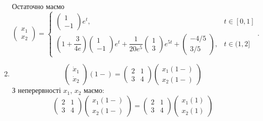 \begin{solution}
\begin{enumerate}
		Остаточно маємо 
		\[
			\begin{pmatrix}
			x_1 \\
			x_2
			\end{pmatrix}
			=
			\begin{cases}
				\begin{pmatrix}
					1 \\
					-1
				\end{pmatrix} 
				e^t, & t \in [0, 1] \\
				\left(1 + \dfrac{3}{4e}\right) 
				\begin{pmatrix}
				1 \\
				-1
				\end{pmatrix} 
				e^t 
				+ 
				\dfrac{1}{20e^5} 
				\begin{pmatrix}
				1 \\
				3
				\end{pmatrix} 
				e^{5t} 
				+ 
				\begin{pmatrix} 
					-4/5 \\
					3/5
				\end{pmatrix}			
				, & t \in (1, 2]
			\end{cases}.
		\]
		\item 
		\[
			\begin{pmatrix}
				\dot x_1 \\
				\dot x_2
			\end{pmatrix}
			(1-) 
			= 
			\begin{pmatrix}
				2 & 1 \\
				3 & 4
			\end{pmatrix}
			\begin{pmatrix}
				x_1(1-) \\
				x_2(1-)
			\end{pmatrix}
		\]
		З неперервності $x_1$, $x_2$ маємо:
		\[
			\begin{pmatrix}
				2 & 1 \\
				3 & 4
			\end{pmatrix}
			\begin{pmatrix}
				x_1(1-) \\
				x_2(1-)
			\end{pmatrix}
			=
			\begin{pmatrix}
			2 & 1 \\
			3 & 4
			\end{pmatrix}
			\begin{pmatrix}
			x_1(1) \\
			x_2(1)
			\end{pmatrix}
		\]

\end{enumerate}
\end{solution}
